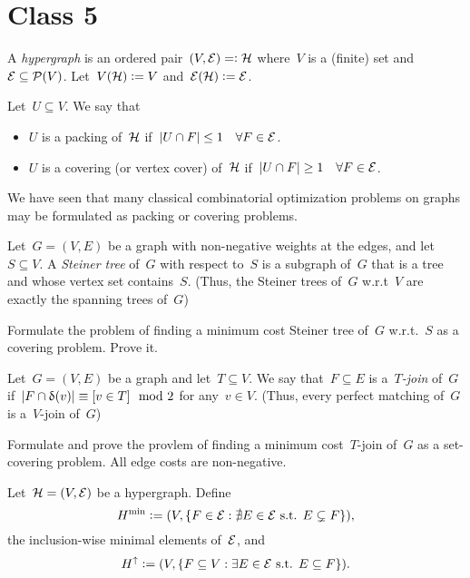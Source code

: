 \documentclass[main.tex]{subfiles}
\begin{document}
\chapter{Class 5}

\begin{recall}
	A \emph{hypergraph} is an ordered pair~$(V, \mathcal{E}) =\vcentcolon \mathcal{H}$ where~$V$ is a (finite) set and~$\mathcal{E} \subseteq \mathcal{P}(V)$. Let~$V(\mathcal{H}) \vcentcolon= V$ and~$\mathcal{E}(\mathcal{H}) \vcentcolon= \mathcal{E}$.
\end{recall}

Let~$U \subseteq V$. We say that
\begin{itemize}
	\item $U$ is a packing of~$\mathcal{H}$ if~$|U \cap F| \leq 1 \quad \forall F \in \mathcal{E}$.
	\item $U$ is a covering (or vertex cover) of~$\mathcal{H}$ if~$|U \cap F| \geq 1 \quad \forall F \in \mathcal{E}$.
\end{itemize}

We have seen that many classical combinatorial optimization problems on graphs may be formulated as packing or covering problems.

\begin{exercise}
	Let~$G = (V, E)$ be a graph with non-negative weights at the edges, and let~$S \subseteq V$. A \emph{Steiner tree} of~$G$ with respect to~$S$ is a subgraph of~$G$ that is a tree and whose vertex set contains~$S$. (Thus, the Steiner trees of~$G$ w.r.t~$V$ are exactly the spanning trees of~$G$)

	Formulate the problem of finding a minimum cost Steiner tree of~$G$ w.r.t.~$S$ as a covering problem. Prove it.
\end{exercise}

\begin{exercise}
	Let~$G = (V, E)$ be a graph and let~$T \subseteq V$. We say that~$F \subseteq E$ is a~\emph{$T$-join} of~$G$ if~$|F \cap \updelta(v)| \equiv [v \in T] \mod 2$ for any~$v \in V$. (Thus, every perfect matching of~$G$ is a~$V$-join of~$G$)

	Formulate and prove the provlem of finding a minimum cost~$T$-join of~$G$ as a set-covering problem. All edge costs are non-negative.
\end{exercise}

Let~$\mathcal{H} = (V, \mathcal{E})$ be a hypergraph. Define
$$ H^{\min} \vcentcolon= (V, \{F \in \mathcal{E} : \nexists E \in \mathcal{E} \text{ s.t. } E \subsetneq F\}), $$
the inclusion-wise minimal elements of~$\mathcal{E}$, and
$$ H^\uparrow \vcentcolon= (V, \{F \subseteq V : \exists E \in \mathcal{E} \text{ s.t. } E \subseteq F\}). $$
\end{document}
